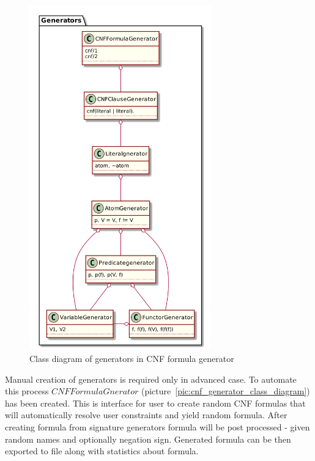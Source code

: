 \begin{figure}[h]
\begin{centering}
  \includegraphics[width=0.7\textwidth]{logic-formula-generator/fol/cnf_signature_generators.png}
  \caption{Class diagram of generators in CNF formula generator}
  \label{pic:fol_signature_generator_class_diagram}
\end{centering}
\end{figure}

Manual creation of generators is required only in advanced case. To automate this process $CNFFormulaGnerator$ (picture~\ref{pic:cnf_generator_class_diagram}) has been created. This is interface for user to create random CNF formulas that will automatically resolve user constraints and yield random formula. After creating formula from signature generators formula will be post processed - given random names and optionally negation sign. Generated formula can be then exported to file along with statistics about formula.

